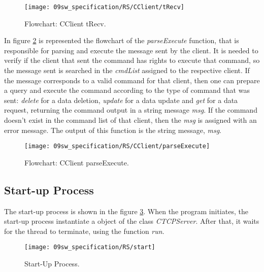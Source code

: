 \begin{figure}[H]
	\centering
	\texttt{[image: 09sw\_specification/RS/CClient/tRecv]}
	\caption{Flowchart: CClient tRecv.}
	\label{fig:RSRecv}
\end{figure}

In figure \ref{fig:parseExecute} is represented the flowchart of the \textit{parseExecute} function, that is responsible for parsing and execute the message sent by the client. It is needed to verify if the client that sent the command has rights to execute that command, so the message sent is searched in the \textit{cmdList} assigned to the respective client. If the message corresponds to a valid command for that client, then one can prepare a query and execute the command according to the type of command that was sent: \textit{delete} for a data deletion, \textit{update} for a data update and \textit{get} for a data request, returning the command output in a string message \textit{msg}. If the command doesn't exist in the command list of that client, then the \textit{msg} is assigned with an error message. The output of this function is the string message, \textit{msg}.

\begin{figure}[H]
	\centering
	\texttt{[image: 09sw\_specification/RS/CClient/parseExecute]}
	\caption{Flowchart: CClient parseExecute.}
	\label{fig:parseExecute}
\end{figure}

\subsection{Start-up Process}
The start-up process is shown in the figure \ref{fig:RSstart}. When the program initiates, the start-up process instantiate a object of the class \textit{CTCPServer}. After that, it waits for the thread to terminate, using the function \textit{run}.

\begin{figure}[H]
	\centering
	\texttt{[image: 09sw\_specification/RS/start]}
	\caption{Start-Up Process.}
	\label{fig:RSstart}
\end{figure}